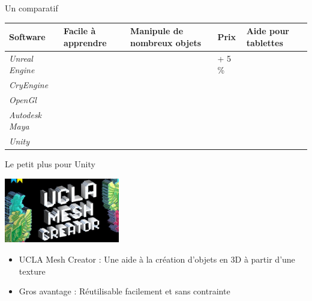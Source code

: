 \documentclass[a4paper,10pt]{beamer}
\begin{document}
		\begin{frame}{Un comparatif}
			\begin{tabular}{|M{45pt}|M{40pt}|M{45pt}|M{75pt}|M{30pt}|}
				\hline
				\textbf{Software} & \textbf{Facile à apprendre} & \textbf{Manipule de nombreux objets} & \textbf{Prix} & \textbf{Aide pour tablettes}\\
				\hline
				\textit{Unreal Engine} & \color{green}{\checkmark} & \color{green}{\checkmark} & \color{orange}{19\euro/mois} + 5 \% & \color{red}{$\times$}\\
				\hline
				\textit{CryEngine} & \color{green}{\checkmark} & \color{green}{\checkmark} & \color{orange}{9.99\euro/mois} & \color{orange}{$\sim$}\\
				\hline
				\textit{OpenGl} & \color{red}{$\times$} & \color{orange}{$\sim$} & \color{green}{0\euro} & \color{red}{$\times$}\\
				\hline
				\textit{Autodesk Maya} & \color{red}{$\times$} & \color{green}{\checkmark} & \color{red}{\$185.00/mois} & \color{orange}{$\sim$}\\
				\hline
				\textit{Unity} & \color{green}{\checkmark} & \color{green}{\checkmark} & \color{green}{0\euro : licence gratuite} & \color{green}{\checkmark} \\
				\hline
			\end{tabular}
		\end{frame}
		
		\begin{frame}{Le petit plus pour Unity}
			\centerline{\includegraphics[height=80pt]{images/techno/ucla.jpg}}
			
			\begin{itemize}
				\item UCLA Mesh Creator : Une aide à la création d'objets en 3D à partir d'une texture
				\item Gros avantage : Réutilisable facilement et sans contrainte
			\end{itemize}
			
		\end{frame}
		

	
\end{document}
